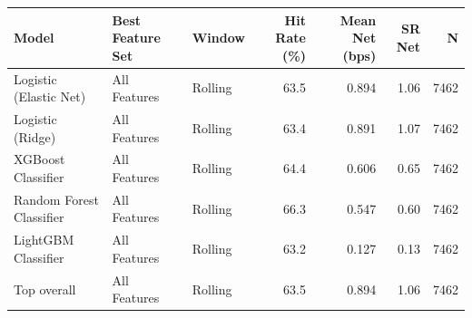 \begin{tabular}{lllrrrr}
\toprule
Model & Best Feature Set & Window & Hit Rate (\%) & Mean Net (bps) & SR Net & N \\
\midrule
Logistic (Elastic Net) & All Features & Rolling & 63.5 & 0.894 & 1.06 & 7462 \\
Logistic (Ridge) & All Features & Rolling & 63.4 & 0.891 & 1.07 & 7462 \\
XGBoost Classifier & All Features & Rolling & 64.4 & 0.606 & 0.65 & 7462 \\
Random Forest Classifier & All Features & Rolling & 66.3 & 0.547 & 0.60 & 7462 \\
LightGBM Classifier & All Features & Rolling & 63.2 & 0.127 & 0.13 & 7462 \\
\midrule
Top overall & All Features & Rolling & 63.5 & 0.894 & 1.06 & 7462 \\
\bottomrule
\end{tabular}
